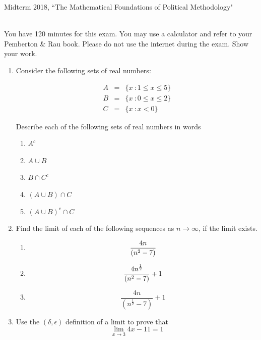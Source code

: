 \documentclass[11pt]{article}
\begin{document}
\noindent \large Midterm 2018, ``The Mathematical Foundations of Political Methodology"

\normalsize
\ \\You have 120 minutes for this exam.  You may use a calculator and refer to your Pemberton \& Rau book.  Please do not use the internet during the exam.  Show your work.

\begin{enumerate}

\item Consider the following sets of real numbers:

\begin{eqnarray}
A&=& \{x\ : 1\leq x\leq 5\} \nonumber\\
B&=& \{x\ : 0\leq x\leq 2\}\nonumber\\
C&=& \{x\ : x<0\}\nonumber
\end{eqnarray}

Describe each of the following sets of real numbers in words
\begin{enumerate}
\item $A^c$

\item $A\cup B$

\item $B\cap C^c$
\item $(A\cup B)\cap C$
\item $(A\cup B)^c\cap C$

\end{enumerate}

\vspace{.2in}

\item Find the limit of each of the following sequences as $n\rightarrow \infty$, if the limit exists.
\begin{enumerate}
\item $${{4n}\over{(n^2-7)}}$$
\item $${{4n^{\frac{1}{2}}}\over{(n^2-7)}}+1$$
\item  $$\frac{4n}{(n^{\frac{1}{2}}-7)}+1$$
\end{enumerate}

\vspace{.2in}
\item Use the $(\delta, \epsilon)$ definition of a limit to prove that 
$$\lim_{x\rightarrow 3} 4x-11=1$$
%


\end{enumerate}
\end{document}

